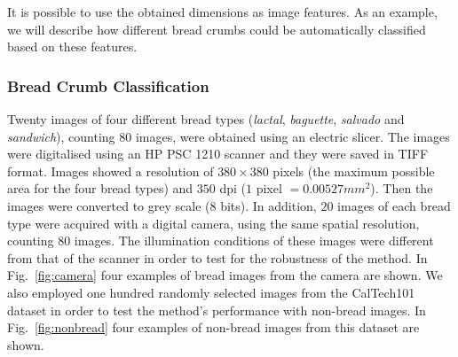 \documentclass[oneside,a4paper,english,links,12pt]{article}
\begin{document}
It is possible to use the obtained dimensions as image features. As an example, we will describe how different bread crumbs could be automatically classified based on these features.

\subsubsection{Bread Crumb Classification}
Twenty images of four different bread types ({\em lactal}, {\em baguette}, {\em salvado} and {\em sandwich}), counting $80$ images, were obtained using an electric slicer. The images were digitalised using an HP PSC 1210 scanner and they were saved in TIFF format. Images showed a resolution of $380 \times 380$ pixels (the maximum possible area for the four bread types) and $350$ dpi ($1$ pixel $= 0.00527 mm^{2}$). Then the images were converted to grey scale ($8$ bits). In addition, $20$ images of each bread type were acquired with a digital camera, using the same spatial resolution, counting $80$ images. The illumination conditions of these images were different from that of the scanner in order to test for the robustness of the method. In Fig.~\ref{fig:camera} four examples of bread images from the camera are shown. We also employed one hundred randomly selected images from the CalTech101~\cite{FeiFei04} dataset in order to test the method's performance with non-bread images. In Fig.~\ref{fig:nonbread} four examples of non-bread images from this dataset are shown. 
\end{document}

